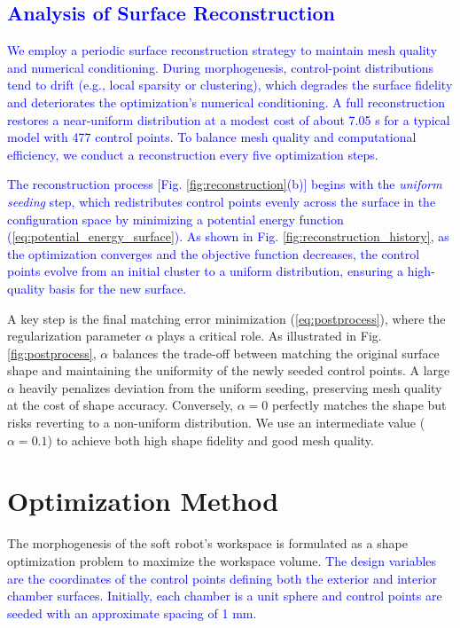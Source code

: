 \documentclass[journal]{IEEEtran}
\theoremstyle{definition}
\begin{document}
\subsection{\textcolor{blue}{Analysis of Surface Reconstruction}}
\label{sec:sphere_mapping:reconstruction_analysis}

\textcolor{blue}{We employ a periodic surface reconstruction strategy to maintain mesh quality and numerical conditioning. During morphogenesis, control-point distributions tend to drift (e.g., local sparsity or clustering), which degrades the surface fidelity and deteriorates the optimization's numerical conditioning. A full reconstruction restores a near-uniform distribution at a modest cost of about 7.05 s for a typical model with 477 control points. To balance mesh quality and computational efficiency, we conduct a reconstruction every five optimization steps.}
  
\textcolor{blue}{The reconstruction process [Fig. \ref{fig:reconstruction}(b)] begins with the \textit{uniform seeding} step, which redistributes control points evenly across the surface in the configuration space by minimizing a potential energy function (\ref{eq:potential_energy_surface}). As shown in Fig. \ref{fig:reconstruction_history}, as the optimization converges and the objective function decreases, the control points evolve from an initial cluster to a uniform distribution, ensuring a high-quality basis for the new surface.}

A key step is the final matching error minimization (\ref{eq:postprocess}), where the regularization parameter $\alpha$ plays a critical role. As illustrated in Fig. \ref{fig:postprocess}, $\alpha$ balances the trade-off between matching the original surface shape and maintaining the uniformity of the newly seeded control points. A large $\alpha$ heavily penalizes deviation from the uniform seeding, preserving mesh quality at the cost of shape accuracy. Conversely, $\alpha=0$ perfectly matches the shape but risks reverting to a non-uniform distribution. We use an intermediate value ($\alpha=0.1$) to achieve both high shape fidelity and good mesh quality.

\section{Optimization Method}
\label{sec:optimization}

The morphogenesis of the soft robot's workspace is formulated as a shape optimization problem to maximize the workspace volume. \textcolor{blue}{The design variables are the coordinates of the control points defining both the exterior and interior chamber surfaces. Initially, each chamber is a unit sphere and control points are seeded with an approximate spacing of 1 mm.}
\end{document}
